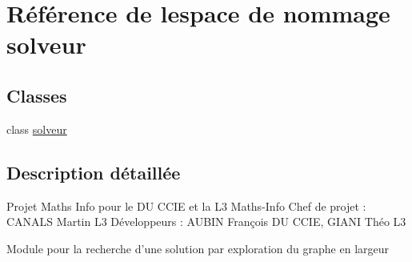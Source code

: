 \hypertarget{namespacesolveur}{}\section{Référence de l\textquotesingle{}espace de nommage solveur}
\label{namespacesolveur}
\subsection*{Classes}
\begin{DoxyCompactItemize}
\item 
class \hyperlink{classsolveur_1_1solveur}{solveur}
\end{DoxyCompactItemize}


\subsection{Description détaillée}
\begin{DoxyVerb}Projet Maths Info pour le DU CCIE et la L3 Maths-Info
Chef de projet : CANALS Martin L3
Développeurs : AUBIN François DU CCIE, GIANI Théo L3

Module pour la recherche d'une solution par exploration du graphe en largeur\end{DoxyVerb}
 